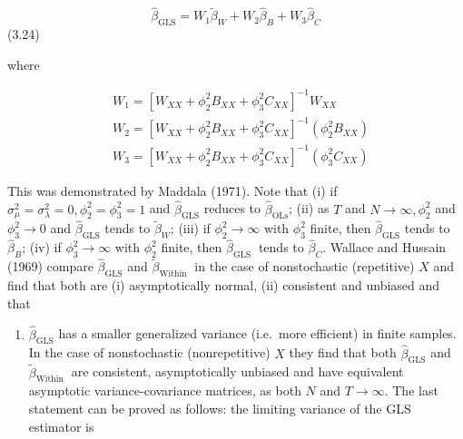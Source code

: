\documentclass[
]{book}
\providecommand{\tightlist}{%
  \setlength{\itemsep}{0pt}\setlength{\parskip}{0pt}}
\begin{document}
\begin{equation}
\widehat{\beta}_{\mathrm{GLS}}=W_{1} \widetilde{\beta}_{W}+W_{2} \widehat{\beta}_{B}+W_{3} \widehat{\beta}_{C}
\end{equation} (3.24)

where

\begin{equation}
\begin{aligned}
&W_{1}=\left[W_{X X}+\phi_{2}^{2} B_{X X}+\phi_{3}^{2} C_{X X}\right]^{-1} W_{X X} \\
&W_{2}=\left[W_{X X}+\phi_{2}^{2} B_{X X}+\phi_{3}^{2} C_{X X}\right]^{-1}\left(\phi_{2}^{2} B_{X X}\right) \\
&W_{3}=\left[W_{X X}+\phi_{2}^{2} B_{X X}+\phi_{3}^{2} C_{X X}\right]^{-1}\left(\phi_{3}^{2} C_{X X}\right)
\end{aligned}
\end{equation}

This was demonstrated by Maddala (1971). Note that (i) if \(\sigma_{\mu}^{2}=\sigma_{\lambda}^{2}=0, \phi_{2}^{2}=\phi_{3}^{2}=1\) and \(\widehat{\beta}_{\mathrm{GLS}}\) reduces to \(\widehat{\beta}_{\mathrm{OLs}}\); (ii) as \(T\) and \(N \rightarrow \infty, \phi_{2}^{2}\) and \(\phi_{3}^{2} \rightarrow 0\) and \(\widehat{\beta}_{\mathrm{GLS}}\) tends to \(\widetilde{\beta}_{W}\); (iii) if
\(\phi_{2}^{2} \rightarrow \infty\) with \(\phi_{3}^{2}\) finite, then \(\widehat{\beta}_{\mathrm{GLS}}\) tends to \(\widehat{\beta}_{B}\); (iv) if \(\phi_{3}^{2} \rightarrow \infty\) with \(\phi_{2}^{2}\) finite, then \(\widehat{\beta}_{\text {GLS }}\) tends to \(\widehat{\beta}_{C}\).
Wallace and Hussain (1969) compare \(\widehat{\beta}_{\mathrm{GLS}}\) and \(\widetilde{\beta}_{\text {Within }}\) in the case of nonstochastic (repetitive) \(X\) and find that both are (i) asymptotically normal, (ii) consistent and unbiased and that

\begin{enumerate}
\def\labelenumi{(\roman{enumi})}
\setcounter{enumi}{2}
\tightlist
\item
  \(\widehat{\beta}_{\mathrm{GLS}}\) has a smaller generalized variance (i.e.~more efficient) in finite samples. In the case of nonstochastic (nonrepetitive) \(X\) they find that both \(\widehat{\beta}_{\mathrm{GLS}}\) and \(\widetilde{\beta}_{\text {Within }}\) are consistent, asymptotically unbiased and have equivalent asymptotic variance-covariance matrices, as both \(N\) and \(T \rightarrow \infty\). The last statement can be proved as follows: the limiting variance of the GLS estimator is
\end{enumerate}
\end{document}
